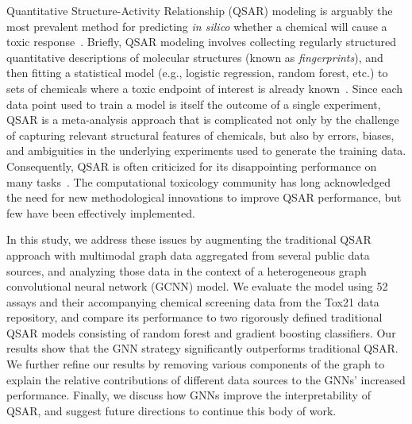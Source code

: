 \documentclass{ws-procs11x85}
\begin{document}
Quantitative Structure-Activity Relationship (QSAR) modeling is arguably the most prevalent method for predicting \textit{in silico} whether a chemical will cause a toxic response~\cite{dudek2006computational}.
Briefly, QSAR modeling involves collecting regularly structured quantitative descriptions of molecular structures (known as \textit{fingerprints}), and then fitting a statistical model (e.g., logistic regression, random forest, etc.) to sets of chemicals where a toxic endpoint of interest is already known~\cite{tropsha2010best,hansch1964p}.
Since each data point used to train a model is itself the outcome of a single experiment, QSAR is a meta-analysis approach that is complicated not only by the challenge of capturing relevant structural features of chemicals, but also by errors, biases, and ambiguities in the underlying experiments used to generate the training data.
Consequently, QSAR is often criticized for its disappointing performance on many tasks~\cite{cherkasov2014qsar,maggiora2006outliers}.
The computational toxicology community has long acknowledged the need for new methodological innovations to improve QSAR performance, but few have been effectively implemented.

In this study, we address these issues by augmenting the traditional QSAR approach with multimodal graph data aggregated from several public data sources, and analyzing those data in the context of a heterogeneous graph convolutional neural network (GCNN) model.
We evaluate the model using 52 assays and their accompanying chemical screening data from the Tox21 data repository, and compare its performance to two rigorously defined traditional QSAR models consisting of random forest and gradient boosting classifiers.
Our results show that the GNN strategy significantly outperforms traditional QSAR.
We further refine our results by removing various components of the graph to explain the relative contributions of different data sources to the GNNs' increased performance.
Finally, we discuss how GNNs improve the interpretability of QSAR, and suggest future directions to continue this body of work.
\end{document}
